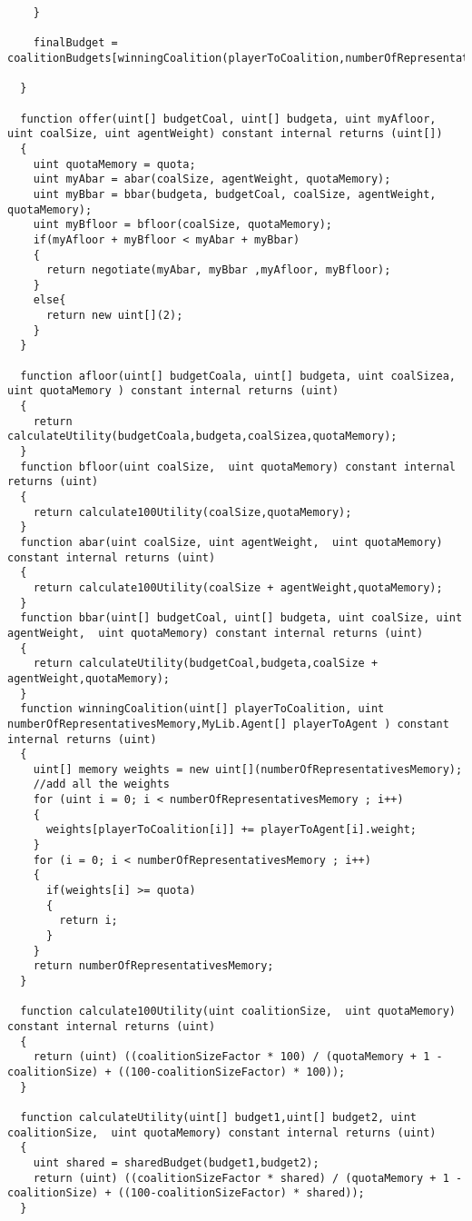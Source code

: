 \begin{lstlisting}
    }

    finalBudget = coalitionBudgets[winningCoalition(playerToCoalition,numberOfRepresentativesMemory,playerToAgent)];

  }

  function offer(uint[] budgetCoal, uint[] budgeta, uint myAfloor, uint coalSize, uint agentWeight) constant internal returns (uint[])
  {
    uint quotaMemory = quota;
    uint myAbar = abar(coalSize, agentWeight, quotaMemory);
    uint myBbar = bbar(budgeta, budgetCoal, coalSize, agentWeight, quotaMemory);
    uint myBfloor = bfloor(coalSize, quotaMemory);
    if(myAfloor + myBfloor < myAbar + myBbar)
    {
      return negotiate(myAbar, myBbar ,myAfloor, myBfloor);
    }
    else{
      return new uint[](2);
    }
  }

  function afloor(uint[] budgetCoala, uint[] budgeta, uint coalSizea, uint quotaMemory ) constant internal returns (uint)
  {
    return calculateUtility(budgetCoala,budgeta,coalSizea,quotaMemory);
  }
  function bfloor(uint coalSize,  uint quotaMemory) constant internal returns (uint)
  {
    return calculate100Utility(coalSize,quotaMemory);
  }
  function abar(uint coalSize, uint agentWeight,  uint quotaMemory) constant internal returns (uint)
  {
    return calculate100Utility(coalSize + agentWeight,quotaMemory);
  }
  function bbar(uint[] budgetCoal, uint[] budgeta, uint coalSize, uint agentWeight,  uint quotaMemory) constant internal returns (uint)
  {
    return calculateUtility(budgetCoal,budgeta,coalSize + agentWeight,quotaMemory);
  }
  function winningCoalition(uint[] playerToCoalition, uint numberOfRepresentativesMemory,MyLib.Agent[] playerToAgent ) constant internal returns (uint)
  {
    uint[] memory weights = new uint[](numberOfRepresentativesMemory);
    //add all the weights
    for (uint i = 0; i < numberOfRepresentativesMemory ; i++)
    {
      weights[playerToCoalition[i]] += playerToAgent[i].weight;
    }
    for (i = 0; i < numberOfRepresentativesMemory ; i++)
    {
      if(weights[i] >= quota)
      {
        return i;
      }
    }
    return numberOfRepresentativesMemory;
  }

  function calculate100Utility(uint coalitionSize,  uint quotaMemory) constant internal returns (uint)
  {
    return (uint) ((coalitionSizeFactor * 100) / (quotaMemory + 1 - coalitionSize) + ((100-coalitionSizeFactor) * 100));
  }

  function calculateUtility(uint[] budget1,uint[] budget2, uint coalitionSize,  uint quotaMemory) constant internal returns (uint)
  {
    uint shared = sharedBudget(budget1,budget2);
    return (uint) ((coalitionSizeFactor * shared) / (quotaMemory + 1 - coalitionSize) + ((100-coalitionSizeFactor) * shared));
  }


\end{lstlisting}
